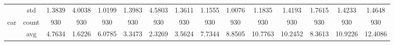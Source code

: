 \begin{table}[H]
{\begin{tabular}{rcccc|c|c|c|c|c|ccccc}
			                                                                               & std                                    & 1.3839                                                                             & 4.0038                                                                    & 1.0199                                                                    & 1.3983                                         & 4.5803                                                                    & 1.3611                                       & 1.1555                                      & 1.0076                                         & 1.1835                                         & 1.4193                                          & 1.7615                                          & 1.4233                                         & 1.4648                                         \\
			car                                                                            & count                                  & 930                                                                                & 930                                                                       & 930                                                                       & 930                                            & 930                                                                       & 930                                          & 930                                         & 930                                            & 930                                            & 930                                             & 930                                             & 930                                            & 930                                            \\
			                                                                               & avg                                    & 4.7634                                                                             & \cellcolor[rgb]{ .776,  .937,  .808}\textcolor[rgb]{ 0,  .38,  0}{1.6226} & 6.0785                                                                    & 3.3473                                         & 2.3269                                                                    & 3.5624                                       & 7.7344                                      & 8.8505                                         & 10.7763                                        & 10.2452                                         & 8.3613                                          & 10.9226                                        & 12.4086                                        \\

\end{tabular}}
\end{table}
